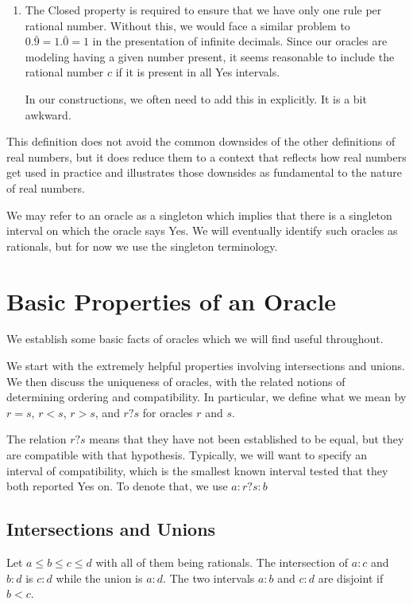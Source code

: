 \documentclass[12pt]{article}
\theoremstyle{remark}
\begin{document}
\begin{enumerate}
    \item The Closed property is required to ensure that we have only one rule per rational number. Without this, we would face a similar problem to $0.\bar{9} = 1.\bar{0} = 1$ in the presentation of infinite decimals. Since our oracles are modeling having a given number present, it seems reasonable to include the rational number $c$ if it is present in all Yes intervals. 
    
    In our constructions, we often need to add this in explicitly. It is a bit awkward.

\end{enumerate}


This definition does not avoid the common downsides of the other definitions of real numbers, but it does reduce them to a context that reflects how real numbers get used in practice and illustrates those downsides as fundamental to the nature of real numbers.  

We may refer to an oracle as a singleton which implies that there is a singleton interval on which the oracle says Yes. We will eventually identify such oracles as rationals, but for now we use the singleton terminology. 


\section{Basic Properties of an Oracle}

We establish some basic facts of oracles which we will find useful throughout. 

We start with the extremely helpful properties involving intersections and unions. We then discuss the uniqueness of oracles, with the related notions of determining ordering and compatibility. In particular, we define what we mean by $r = s$, $r<s$, $r>s$, and $r?s$ for oracles $r$ and $s$. 


The relation $r?s$ means that they have not been established to be equal, but they are compatible with that hypothesis. Typically, we will want to specify an interval of compatibility, which is the smallest known interval tested that they both reported Yes on. To denote that, we use $a:r?s:b$ 

\subsection{ Intersections and Unions}

Let $a \leq b \leq c \leq d$ with all of them being rationals. The intersection of $a:c$ and $b:d$ is $c:d$ while the union is $a:d$. The two intervals $a:b$ and $c:d$ are disjoint if $b < c$. 
\end{document}
